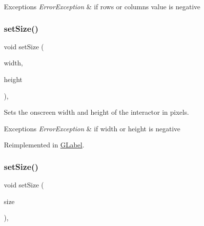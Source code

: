\begin{DoxyExceptions}{Exceptions}
{\em Error\+Exception} & if rows or columns value is negative \\
\hline
\end{DoxyExceptions}
\mbox{\label{classsgl_1_1GInteractor_aca25d49481f9bf5fc8f7df4c086c4ce7}} 
\subsubsection{\texorpdfstring{set\+Size()}{setSize()}\hspace{0.1cm}{\footnotesize\ttfamily [1/2]}}
{\footnotesize\ttfamily void set\+Size (\begin{DoxyParamCaption}\item[{double}]{width,  }\item[{double}]{height }\end{DoxyParamCaption})\hspace{0.3cm}{\ttfamily [virtual]}, {\ttfamily [inherited]}}



Sets the onscreen width and height of the interactor in pixels. 


\begin{DoxyExceptions}{Exceptions}
{\em Error\+Exception} & if width or height is negative \\
\hline
\end{DoxyExceptions}


Reimplemented in \mbox{\hyperlink{classsgl_1_1GLabel_a8ba9af72c23f52d4b93096a13a11f150}{G\+Label}}.

\mbox{\label{classsgl_1_1GInteractor_ae2b628228f192c2702c4ce941b2af68f}} 
\subsubsection{\texorpdfstring{set\+Size()}{setSize()}\hspace{0.1cm}{\footnotesize\ttfamily [2/2]}}
{\footnotesize\ttfamily void set\+Size (\begin{DoxyParamCaption}\item[{const \mbox{\hyperlink{structsgl_1_1GDimension}{G\+Dimension}} \&}]{size }\end{DoxyParamCaption})\hspace{0.3cm}{\ttfamily [virtual]}, {\ttfamily [inherited]}}



